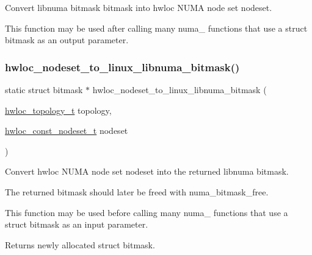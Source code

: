 Convert libnuma bitmask {\ttfamily bitmask} into hwloc N\+U\+MA node set {\ttfamily nodeset}. 

This function may be used after calling many numa\+\_\+ functions that use a struct bitmask as an output parameter. \mbox{\label{a00216_gadfaa14c1bec76965ac2e05f0c3f3473b}} 
\subsubsection{\texorpdfstring{hwloc\+\_\+nodeset\+\_\+to\+\_\+linux\+\_\+libnuma\+\_\+bitmask()}{hwloc\_nodeset\_to\_linux\_libnuma\_bitmask()}}
{\footnotesize\ttfamily static struct bitmask $\ast$ hwloc\+\_\+nodeset\+\_\+to\+\_\+linux\+\_\+libnuma\+\_\+bitmask (\begin{DoxyParamCaption}\item[{\hyperlink{a00186_ga9d1e76ee15a7dee158b786c30b6a6e38}{hwloc\+\_\+topology\+\_\+t}}]{topology,  }\item[{\hyperlink{a00183_ga2f5276235841ad66a79bedad16a5a10c}{hwloc\+\_\+const\+\_\+nodeset\+\_\+t}}]{nodeset }\end{DoxyParamCaption})\hspace{0.3cm}{\ttfamily [static]}}



Convert hwloc N\+U\+MA node set {\ttfamily nodeset} into the returned libnuma bitmask. 

The returned bitmask should later be freed with numa\+\_\+bitmask\+\_\+free.

This function may be used before calling many numa\+\_\+ functions that use a struct bitmask as an input parameter.

\begin{DoxyReturn}{Returns}
newly allocated struct bitmask. 
\end{DoxyReturn}
